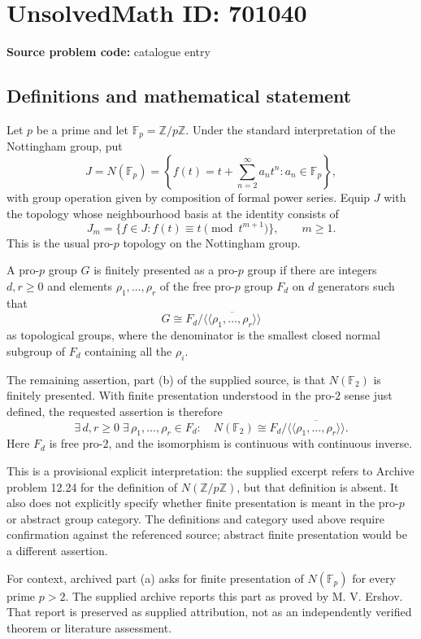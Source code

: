 \documentclass[11pt]{article}
\newcommand{\Z}{\mathbb{Z}}
\newcommand{\F}{\mathbb{F}}
\begin{document}
\section*{UnsolvedMath ID: 701040}
\textbf{Source problem code:} catalogue entry
\subsection{Definitions and mathematical statement}
Let \(p\) be a prime and let \(\F_p=\Z/p\Z\). Under the standard interpretation of the Nottingham group, put
\[
J=N(\F_p)=\left\{f(t)=t+\sum_{n=2}^{\infty}a_nt^n : a_n\in\F_p\right\},
\]
with group operation given by composition of formal power series. Equip \(J\) with the topology whose neighbourhood basis at the identity consists of
\[
J_m=\{f\in J:f(t)\equiv t\pmod{t^{m+1}}\},\qquad m\geq1.
\]
This is the usual pro-\(p\) topology on the Nottingham group.

A pro-\(p\) group \(G\) is finitely presented as a pro-\(p\) group if there are integers \(d,r\geq0\) and elements \(\rho_1,\ldots,\rho_r\) of the free pro-\(p\) group \(F_d\) on \(d\) generators such that
\[
G\cong F_d/\overline{\langle\!\langle\rho_1,\ldots,\rho_r\rangle\!\rangle}
\]
as topological groups, where the denominator is the smallest closed normal subgroup of \(F_d\) containing all the \(\rho_i\).

The remaining assertion, part (b) of the supplied source, is that \(N(\F_2)\) is finitely presented. With finite presentation understood in the pro-\(2\) sense just defined, the requested assertion is therefore
\[
\exists\,d,r\geq0\;\exists\,\rho_1,\ldots,\rho_r\in F_d:
\quad N(\F_2)\cong F_d/\overline{\langle\!\langle\rho_1,\ldots,\rho_r\rangle\!\rangle}.
\]
Here \(F_d\) is free pro-\(2\), and the isomorphism is continuous with continuous inverse.

This is a provisional explicit interpretation: the supplied excerpt refers to Archive problem 12.24 for the definition of \(N(\Z/p\Z)\), but that definition is absent. It also does not explicitly specify whether finite presentation is meant in the pro-\(p\) or abstract group category. The definitions and category used above require confirmation against the referenced source; abstract finite presentation would be a different assertion.

For context, archived part (a) asks for finite presentation of \(N(\F_p)\) for every prime \(p>2\). The supplied archive reports this part as proved by M. V. Ershov. That report is preserved as supplied attribution, not as an independently verified theorem or literature assessment.
\end{document}
